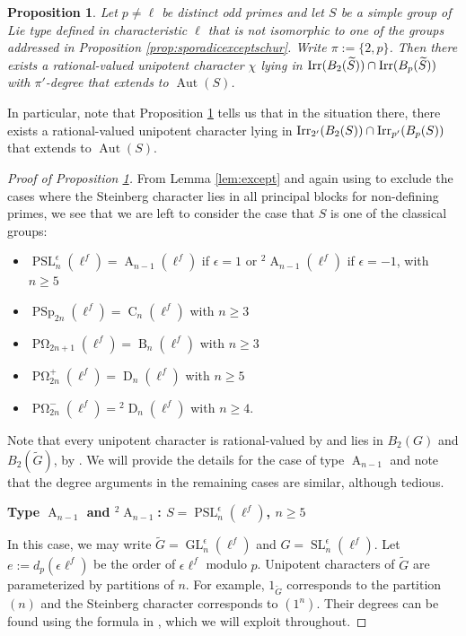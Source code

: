 \documentclass[12pt,leqno,a4paper]{amsart}
\newcommand{\SL}{{\operatorname{SL}}}
\newcommand{\PSL}{{\operatorname{PSL}}}
\newcommand{\POmega}{{\operatorname{P\Omega}}}
\newcommand{\tw}[1]{{}^#1\!}
\def\irr#1{{\rm Irr}(#1)}
\def\irrp#1#2{{\rm Irr}_{#1'}(#2)}
\newtheorem{prop}[thm]{Proposition}
\theoremstyle{remark}
\newcommand\wt[1]{\widetilde{#1}}
\newcommand{\GL}{\operatorname{GL}}
\newcommand{\PSp}{\operatorname{PSp}}
\newcommand{\aut}{\operatorname{Aut}}
\newcommand\type[1]{\operatorname{#1}}
\begin{document}
\begin{prop}\label{prop:nondef}
Let $p\neq \ell$ be distinct odd primes and let $S$ be a simple group of Lie type defined in characteristic $\ell$ that is not isomorphic to one of the groups addressed in Proposition \ref{prop:sporadicexceptschur}.  Write $\pi:=\{2, p\}$.  
Then there exists a rational-valued unipotent character $\chi$ lying in $\irr{B_{2}(\wt{S})} \cap  \irr{B_{p}(\wt{S})}$ with $\pi'$-degree that extends to $\aut(S)$.
\end{prop}

In particular, note that Proposition \ref{prop:nondef} tells us that in the situation there, there exists a rational-valued unipotent character lying in $\irrp{2}{B_{2}({S})} \cap  \irrp{p}{B_{p}({S})}$ that extends to $\aut(S)$.
\begin{proof}[Proof of Proposition \ref{prop:nondef}]
From Lemma \ref{lem:except} and again using \cite{Hiss08} to exclude the cases where the Steinberg character lies in all principal blocks for non-defining primes, we see that we are left to consider the case that $S$ is one of the classical groups:
\begin{itemize}
\item $\PSL_n^\epsilon(\ell^f)=\type{A}_{n-1}(\ell^f)$ if $\epsilon=1$ or $\tw{2}\type{A}_{n-1}(\ell^f)$ if $\epsilon=-1$, with $n\geq 5$
\item $\PSp_{2n}(\ell^f)=\type{C}_n(\ell^f)$ with $n\geq 3$
\item $\POmega_{2n+1}(\ell^f)=\type{B}_n(\ell^f)$ with $n\geq 3$
\item $\POmega_{2n}^+(\ell^f)=\type{D}_n(\ell^f)$ with $n\geq 5$
\item $\POmega_{2n}^-(\ell^f)=\tw{2}\type{D}_n(\ell^f)$ with $n\geq 4$.
\end{itemize}
 Note that every unipotent character is rational-valued by \cite{lusztig02} and lies in $B_2(G)$ and $B_2(\wt{G})$, by \cite[Theorem 21.14]{CE04}. We will provide the details for the case of type $\type{A}_{n-1}$ and note that the degree arguments in the remaining cases are similar, although tedious.

\smallskip

\noindent\textbf{Type $\type{A}_{n-1}$ and $\tw{2}\type{A}_{n-1}$: $S=\PSL_n^\epsilon(\ell^f)$, $n\geq 5$}



In this case, we may write $\wt{G}=\GL_n^\epsilon(\ell^f)$ and $G=\SL_n^\epsilon(\ell^f)$.  Let $e:=d_p(\epsilon \ell^f)$ be the order of $\epsilon \ell^f$ modulo $p$.  Unipotent characters of $\wt{G}$ are parameterized by partitions of $n$. For example, $1_{\wt{G}}$ corresponds to the partition $(n)$ and the Steinberg character corresponds to $(1^n)$.  
Their degrees can be found using the formula in \cite[Section 13.8]{carter}, which we will exploit throughout. 


\end{proof}
\end{document}
